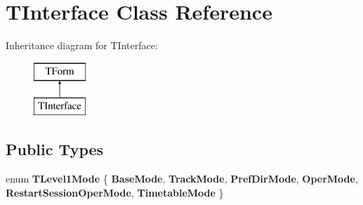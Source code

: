 \hypertarget{class_t_interface}{}\section{T\+Interface Class Reference}
\label{class_t_interface}
Inheritance diagram for T\+Interface\+:\begin{figure}[H]
\begin{center}
\leavevmode
\includegraphics[height=2.000000cm]{class_t_interface}
\end{center}
\end{figure}
\subsection*{Public Types}
\begin{DoxyCompactItemize}
\item 
\mbox{\label{class_t_interface_afdd8ad9ea5529b9193c4b4c5ac683bc5}} 
enum {\bfseries T\+Level1\+Mode} \{ \newline
{\bfseries Base\+Mode}, 
{\bfseries Track\+Mode}, 
{\bfseries Pref\+Dir\+Mode}, 
{\bfseries Oper\+Mode}, 
\newline
{\bfseries Restart\+Session\+Oper\+Mode}, 
{\bfseries Timetable\+Mode}
 \}
\end{DoxyCompactItemize}
